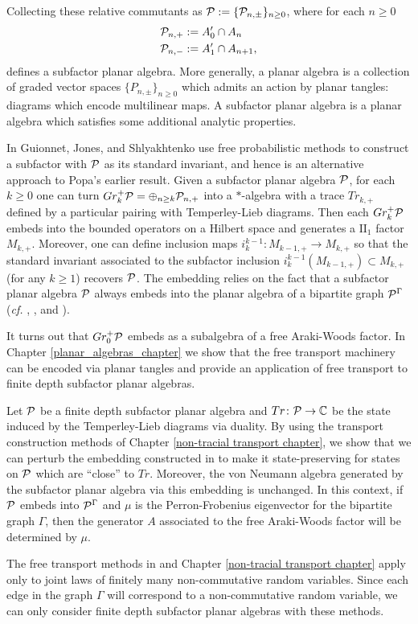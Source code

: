 Collecting these relative commutants as $\mathcal{P}:=\{\mathcal{P}_{n,\pm}\}_{n\geq 0}$, where for each $n\geq 0$
	\begin{align*}
		\mathcal{P}_{n,+}&:= A_0'\cap A_n\\
		\mathcal{P}_{n,-}&:= A_1' \cap A_{n+1},
	\end{align*}
defines a subfactor planar algebra. More generally, a planar algebra is a collection of graded vector spaces $\{P_{n,\pm}\}_{n\geq 0}$ which admits an action by planar tangles: diagrams which encode multilinear maps. A subfactor planar algebra is a planar algebra which satisfies some additional analytic properties.

In \cite{GJS10} Guionnet, Jones, and Shlyakhtenko use free probabilistic methods to construct a subfactor with $\mathcal{P}$ as its standard invariant, and hence is an alternative approach to Popa's earlier result. Given a subfactor planar algebra $\mathcal{P}$, for each $k\geq 0$ one can turn $Gr_k^+\mathcal{P}=\oplus_{n\geq k} \mathcal{P}_{n,+}$ into a $*$-algebra with a trace $Tr_{k,+}$ defined by a particular pairing with Temperley-Lieb diagrams.  Then each $Gr_k^+\mathcal{P}$ embeds into the bounded operators on a Hilbert space and generates a $\text{II}_1$ factor $M_{k,+}$. Moreover, one can define inclusion maps $i^{k-1}_k\colon M_{k-1,+}\to M_{k,+}$ so that the standard invariant associated to the subfactor inclusion $i_k^{k-1}(M_{k-1,+})\subset M_{k,+}$ (for any $k\geq 1$) recovers $\mathcal{P}$. The embedding relies on the fact that a subfactor planar algebra $\mathcal{P}$ always embeds into the planar algebra of a bipartite graph $\mathcal{P}^\Gamma$ (\emph{cf.} \cite{Jon00}, \cite{JP11}, and \cite{MW10}). 

It turns out that $Gr_0^+\mathcal{P}$ embeds as a subalgebra of a free Araki-Woods factor. In Chapter \ref{planar_algebras_chapter} we show that the free transport machinery can be encoded via planar tangles and provide an application of free transport to finite depth subfactor planar algebras.

Let $\mathcal{P}$ be a finite depth subfactor planar algebra and $Tr\colon \mathcal{P}\to\mathbb{C}$ be the state induced by the Temperley-Lieb diagrams via duality. By using the transport construction methods of Chapter \ref{non-tracial transport chapter}, we show that we can perturb the embedding constructed in \cite{GJS10} to make it state-preserving for states on $\mathcal{P}$ which are ``close'' to $Tr$. Moreover, the von Neumann algebra generated by the subfactor planar algebra via this embedding is unchanged. In this context, if $\mathcal{P}$ embeds into $\mathcal{P}^\Gamma$ and $\mu$ is the Perron-Frobenius eigenvector for the bipartite graph $\Gamma$, then the generator $A$ associated to the free Araki-Woods factor will be determined by $\mu$.

The free transport methods in \cite{GS14} and Chapter \ref{non-tracial transport chapter} apply only to joint laws of finitely many non-commutative random variables. Since each edge in the graph $\Gamma$ will correspond to a non-commutative random variable, we can only consider finite depth subfactor planar algebras with these methods.
